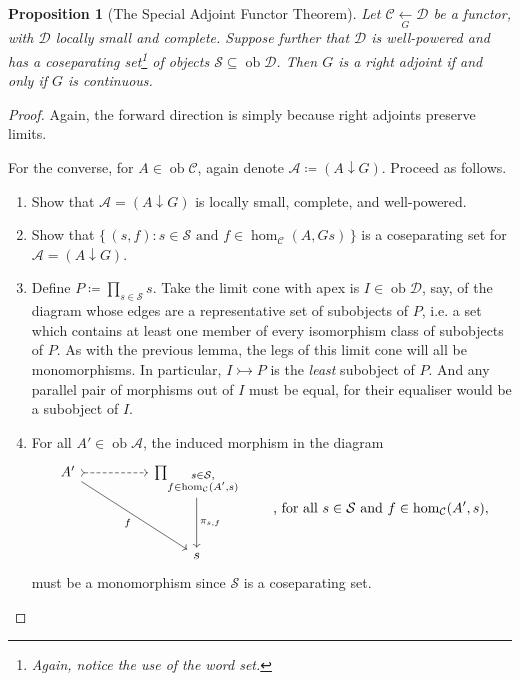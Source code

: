 \documentclass[a4paper,11pt]{article}
\theoremstyle{break_italics}
\newtheorem*{proposition*}{Proposition}
\theoremstyle{break_upright}
\theoremstyle{remark}
\newcommand{\ob}{\operatorname{ob}}
\newcommand{\C}{\mathcal{C}}
\newcommand{\D}{\mathcal{D}}
\begin{document}
\begin{proposition*}[The Special Adjoint Functor Theorem]
	Let $\C \xleftarrow[G]{} \D$ be a functor, with $\D$ locally small and complete. Suppose further that $\D$ is well-powered and has a coseparating set\footnote{Again, notice the use of the word \textit{set}.} of objects $\mathcal S \subseteq \ob\D$. Then $G$ is a right adjoint if and only if $G$ is continuous.
\end{proposition*}
\begin{proof}
	Again, the forward direction is simply because right adjoints preserve limits.

	For the converse, for $A \in \ob\C$, again denote $\mathcal A \coloneqq (A\downarrow G)$. Proceed as follows.
	\begin{enumerate}
		\item Show that $\mathcal A = (A \downarrow G)$ is locally small, complete, and well-powered.
		\item Show that $\{\,(s, f) : s \in \mathcal S \text{ and } f \in \hom_\C(A, Gs)\,\}$ is a coseparating set for $\mathcal A = (A \downarrow G)$.
		\item Define $P \coloneqq \prod_{s \in \mathcal S} s$. Take the limit cone with apex is $I \in \ob\D$, say, of the diagram whose edges are a representative set of subobjects of $P$, i.e. a set which contains at least one member of every isomorphism class of subobjects of $P$. As with the previous lemma, the legs of this limit cone will all be monomorphisms. In particular, $I \rightarrowtail P$ is the \textit{least} subobject of $P$. And any parallel pair of morphisms out of $I$ must be equal, for their equaliser would be a subobject of $I$.
		\item For all $A' \in \ob\mathcal A$, the induced morphism in the diagram
			\[
\begin{tikzcd}
A' \arrow[rr, dashed, tail] \arrow[rrdd, "f"'] &  & {\prod_{\substack{s\in \mathcal S, \\ f \in \hom_\C(A',s)}}} \arrow[dd, "{\pi_{s,f}}"] \\
                                              &  &                                                                                       \\
                                              &  & s                                                                                    
\end{tikzcd} \qquad \text{, for all } s\in\mathcal S \text{ and } f \in \hom_\C(A',s),
			\]
			must be a monomorphism since $\mathcal S$ is a coseparating set. 

\end{enumerate}
\end{proof}
\end{document}

